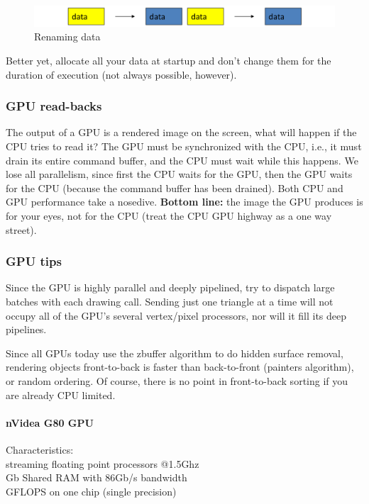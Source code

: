 \begin{figure}[h]
    \centering
    \includegraphics[width=\linewidth]{images/gpu-buffer-renaming-data}
    \caption{Renaming data}
    \label{fig:gpu-buffer-renaming-data}
\end{figure}

Better yet, allocate all your data at startup and don’t
change them for the duration of execution (not always
possible, however).

\subsubsection{GPU read-backs}
The output of a GPU is a rendered image on the screen,
what will happen if the CPU tries to read it?
The GPU must be synchronized with the CPU, i.e., it
must drain its entire command buffer, and the CPU must
wait while this happens.
We lose all parallelism, since first the CPU waits for the
GPU, then the GPU waits for the CPU (because the
command buffer has been drained).
Both CPU and GPU performance take a nosedive.
\textbf{Bottom line:} the image the GPU produces is for your
eyes, not for the CPU (treat the CPU \textrightarrow GPU highway as
a one way street).

\subsubsection{GPU tips}
Since the GPU is highly parallel and deeply pipelined,
try to dispatch large batches with each drawing call.
Sending just one triangle at a time will not occupy all of
the GPU’s several vertex/pixel processors, nor will it fill
its deep pipelines.

Since all GPUs today use the zbuffer algorithm to do
hidden surface removal, rendering objects front-to-back
is faster than back-to-front (painters algorithm), or
random ordering.
Of course, there is no point in front-to-back sorting if you
are already CPU limited.

\paragraph{nVidea G80 GPU} Characteristics:\\
 streaming floating point processors @1.5Ghz\\
 Gb Shared RAM with 86Gb/s bandwidth\\
 GFLOPS on one chip (single precision)

